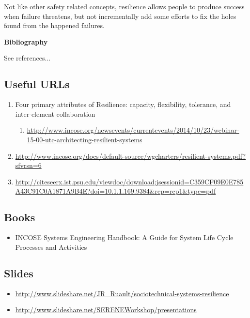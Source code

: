 \documentclass[11pt]{article}
\begin{document}
Not like other safety related concepts, resilience allows people to produce success when failure threatens, but not incrementally add some efforts to fix the holes found from the happened failures.


\begin{center}
  {\Large \bf Bibliography}
\end{center}
See references...
\nocite{*}

\subsection{Useful URLs}
\begin{enumerate}
	\item Four primary attributes of Resilience: capacity, flexibility, tolerance, and inter-element collaboration
	\begin{enumerate}
		\item \url{http://www.incose.org/newsevents/currentevents/2014/10/23/webinar-15-00-utc-architecting-resilient-systems}
	\end{enumerate}
	\item \url{http://www.incose.org/docs/default-source/wgcharters/resilient-systems.pdf?sfvrsn=6}
	\item \url{http://citeseerx.ist.psu.edu/viewdoc/download;jsessionid=C359CF09E0E785A43C91C0A1871A9B4E?doi=10.1.1.169.9384&rep=rep1&type=pdf}
\end{enumerate}

\subsection{Books}
\begin{itemize}
\item INCOSE Systems Engineering Handbook: A Guide for System Life Cycle Processes and Activities
\end{itemize}

\subsection{Slides}
\begin{itemize}
	\item \url{http://www.slideshare.net/JR_Ruault/sociotechnical-systems-resilience}
	\item \url{http://www.slideshare.net/SERENEWorkshop/presentations}
\end{itemize}    


 
\end{document}
